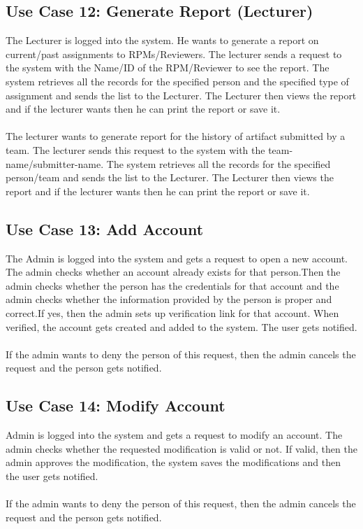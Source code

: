     
    
    
    
    \subsection*{Use Case 12: Generate Report (Lecturer) }
    The Lecturer is logged into the system. He wants to generate a report on current/past assignments to RPMs/Reviewers. The lecturer sends a request to the system with the Name/ID of the RPM/Reviewer to see the report. The system retrieves all the records for the specified person and the specified type of assignment and sends the list to the Lecturer. The Lecturer then views the report and if the lecturer wants then he can print the report or save it.
    \\
    \\
    The lecturer wants to generate report for the history of artifact submitted by a team. The lecturer sends this request to the system with the team-name/submitter-name. The system retrieves all the records for the specified person/team and sends the list to the Lecturer. The Lecturer then views the report and if the lecturer wants then he can print the report or save it.
    
    
    
    
    
    
    
    
    \subsection*{Use Case 13: Add Account }
    The Admin is logged into the system and gets a request to open a new account. The admin checks whether an account already exists for that person.Then the admin checks whether the person has the credentials for that account and the admin checks whether the information provided by the person is proper and correct.If yes, then the admin sets up verification link for that account. When verified, the account gets created and added to the system. The user gets notified.
    \\
    \\
    If the admin wants to deny the person of this request, then the admin cancels the request and the person gets notified.
    
    
    
    
    
    
    
    
    
    \subsection*{Use Case 14: Modify Account }
    Admin is logged into the system and gets a request to modify an account. The admin checks whether the requested modification is valid or not. If valid, then the admin approves the modification, the system saves the modifications and then the user gets notified. 
    \\
    \\
    If the admin wants to deny the person of this request, then the admin cancels the request and the person gets notified.
    
